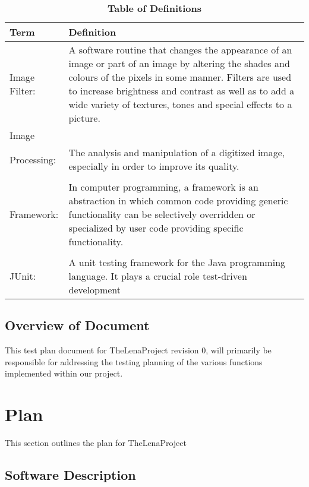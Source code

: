 \documentclass[12pt, titlepage]{article}
\begin{document}
\begin{table}[!htbp]
\caption{\textbf{Table of Definitions}} \label{Table}

\begin{tabularx}{\textwidth}{p{3cm}X}
\toprule
\textbf{Term} & \textbf{Definition}\\
\midrule

Image Filter: & A software routine that changes the appearance of an image or part of an image by altering the shades and colours of the pixels in some manner. Filters are used to increase brightness and contrast as well as to add a wide variety of textures, tones and special effects to a picture.\\ 
Image \\ Processing: & The analysis and manipulation of a digitized image, especially in order to improve its quality. \\
\\Framework: & In computer programming, a framework is an abstraction in which common code providing generic functionality can be selectively overridden or specialized by user code providing specific functionality.\\
\\JUnit: & A unit testing framework for the Java programming language. It plays a crucial role test-driven development\\


\bottomrule
\end{tabularx}

\end{table}	

\subsection{Overview of Document}
This test plan document for TheLenaProject revision 0, will primarily be responsible for addressing the testing planning of the various functions implemented within our project.

\section{Plan}

This section outlines the plan for TheLenaProject
	
\subsection{Software Description}
\end{document}
